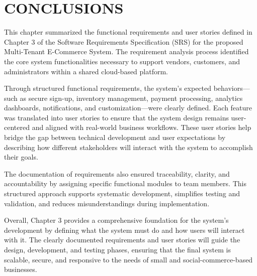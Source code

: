 \chapter{CONCLUSIONS}\label{ch:conclusion}

This chapter summarized the functional requirements and user stories defined in Chapter 3 of the Software Requirements Specification (SRS) for the proposed Multi-Tenant E-Commerce System. The requirement analysis process identified the core system functionalities necessary to support vendors, customers, and administrators within a shared cloud-based platform.

Through structured functional requirements, the system’s expected behaviors—such as secure sign-up, inventory management, payment processing, analytics dashboards, notifications, and customization—were clearly defined. Each feature was translated into user stories to ensure that the system design remains user-centered and aligned with real-world business workflows. These user stories help bridge the gap between technical development and user expectations by describing how different stakeholders will interact with the system to accomplish their goals.

The documentation of requirements also ensured traceability, clarity, and accountability by assigning specific functional modules to team members. This structured approach supports systematic development, simplifies testing and validation, and reduces misunderstandings during implementation.

Overall, Chapter 3 provides a comprehensive foundation for the system’s development by defining what the system must do and how users will interact with it. The clearly documented requirements and user stories will guide the design, development, and testing phases, ensuring that the final system is scalable, secure, and responsive to the needs of small and social-commerce-based businesses.
